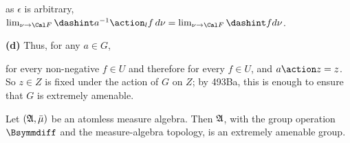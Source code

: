 {\noindent as $\epsilon$ is arbitrary,
$\lim_{\nu\to\Cal F}\dashint a^{-1}\action_lf\,d\nu
=\lim_{\nu\to\Cal F}\dashint fd\nu$.\ \Qed

\medskip

{\bf (d)} Thus, for any $a\in G$,


\noindent for every non-negative $f\in U$ and therefore for every $f\in U$,
and $a\action z=z$.   So
$z\in Z$ is fixed under the action of $G$ on $Z$;  by
493Ba, this is enough to ensure that $G$ is extremely amenable.
}%

 Let $(\frak A,\bar\mu)$ be an atomless measure
algebra.   Then $\frak A$, with the group operation $\Bsymmdiff$ and the
measure-algebra topology, is an extremely
amenable group.

